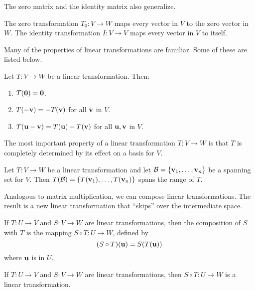\documentclass[../m073main.tex]{subfiles}
\begin{document}
The zero matrix and the identity matrix also generalize.

\begin{definition}
	The zero transformation $T_0 : V \to W$ maps every vector in $V$ to the zero vector in $W$.
	The identity transformation $I : V \to V$ maps every vector in $V$ to itself.
\end{definition}

Many of the properties of linear transformations are familiar.
Some of these are listed below.

\begin{theorem}
	Let $T : V \to W$ be a linear transformation.
	Then:
	\begin{enumerate}[label=(\alph*)]
		\item $T(\mathbf{0}) = \mathbf{0}$.
		\item $T(-\mathbf{v}) = -T(\mathbf{v})$ for all $\mathbf{v}$ in $V$.
		\item $T(\mathbf{u} - \mathbf{v}) = T(\mathbf{u}) - T(\mathbf{v})$ for all $\mathbf{u}, \mathbf{v}$ in $V$.
	\end{enumerate}
\end{theorem}

The most important property of a linear transformation $T : V \to W$ is that $T$ is completely determined by its effect on a basis for $V$.

\begin{theorem}
	Let $T : V \to W$ be a linear transformation and let $\mathcal{B} = \{\mathbf{v}_1, \ldots, \mathbf{v}_n\}$ be a spanning set for $V$.
	Then $T(\mathcal{B}) = \{T(\mathbf{v}_1), \ldots, T(\mathbf{v}_n)\}$ spans the range of $T$.
\end{theorem}

Analogous to matrix multiplication, we can compose linear transformations.
The result is a new linear transformation that ``skips'' over the intermediate space.

\begin{definition}
	If $T : U \to V$ and $S : V \to W$ are linear transformations, then the composition of $S$ with $T$ is the mapping $S \circ T : U \to W$, defined by
	\[ (S \circ T)(\mathbf{u}) = S(T(\mathbf{u})) \]
	where $\mathbf{u}$ is in $U$.
\end{definition}

\begin{theorem}
	If $T : U \to V$ and $S : V \to W$ are linear transformations, then $S \circ T : U \to W$ is a linear transformation.
\end{theorem}
\end{document}
